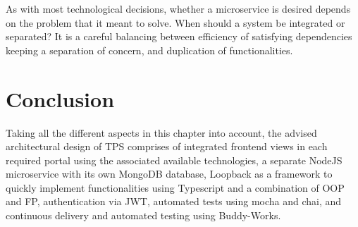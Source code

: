 

As with most technological decisions, whether a microservice is desired depends on the problem that it meant to solve. When should a system be integrated or separated? It is a careful balancing between efficiency of satisfying dependencies keeping a separation of concern, and duplication of functionalities.



%
\section{Conclusion}
Taking all the different aspects in this chapter into account, the advised architectural design of TPS comprises of integrated frontend views in each required portal using the associated available technologies, a separate NodeJS microservice with its own MongoDB database, Loopback as a framework to quickly implement functionalities using Typescript and a combination of OOP and FP, authentication via JWT, automated tests using mocha and chai, and continuous delivery and automated testing using Buddy-Works.

